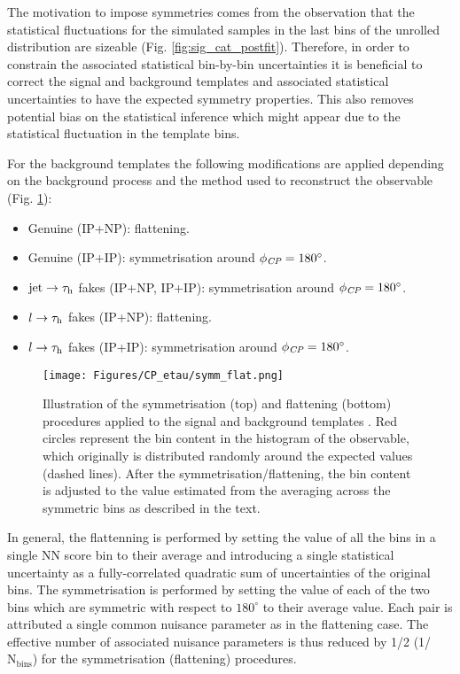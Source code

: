 The motivation to impose symmetries comes from the observation that the statistical fluctuations for the simulated samples in the last bins of the unrolled \phicp distribution are sizeable (Fig. \ref{fig:sig_cat_postfit}). Therefore, in order to constrain the associated statistical bin-by-bin uncertainties it is beneficial to correct the signal and background templates and associated statistical uncertainties to have the expected symmetry properties. This also removes potential bias on the statistical inference which might appear due to the statistical fluctuation in the template bins.

For the background templates the following modifications are applied depending on the background process and the method used to reconstruct the \phicp observable (Fig. \ref{fig:symm_flat}):
\begin{itemize}
    \item Genuine \tauh (IP+NP): flattening.
    \item Genuine \tauh (IP+IP): symmetrisation around $\phi_{\textit{CP}}=180^\circ$.
    \item $\text{jet} \to \tau_\mathrm{h}$ fakes (IP+NP, IP+IP): symmetrisation around $\phi_{\textit{CP}}=180^\circ$.
    \item $l \to \tau_\mathrm{h}$ fakes (IP+NP): flattening.
    \item $l \to \tau_\mathrm{h}$ fakes (IP+IP): symmetrisation around $\phi_{\textit{CP}}=180^\circ$.
\end{itemize}

\begin{figure}[!t]
    \centering
    \texttt{[image: Figures/CP\_etau/symm\_flat.png]}
    \caption{Illustration of the symmetrisation (top) and flattening (bottom) procedures applied to the signal and background templates \cite{Cardini:2021hbb}. Red circles represent the bin content in the histogram of the \phicp observable, which originally is distributed randomly around the expected values (dashed lines). After the symmetrisation/flattening, the bin content is adjusted to the value estimated from the averaging across the symmetric bins as described in the text.}\label{fig:symm_flat}
\end{figure}

In general, the flattenning is performed by setting the value of all the \phicp bins in a single NN score bin to their average and introducing a single statistical uncertainty as a fully-correlated quadratic sum of uncertainties of the original bins. The symmetrisation is performed by setting the value of each of the two bins which are symmetric with respect to $180^\circ$ to their average value. Each pair is attributed a single common nuisance parameter as in the flattening case. The effective number of associated nuisance parameters is thus reduced by 1/2 (1/$\text{N}_\text{bins}$) for the symmetrisation (flattening) procedures.

